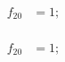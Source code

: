 \cite{foo1999}
\autocite{foo1999}

\begin{align}
  f_{20} &= 1;\\
\end{align}

\begin{eqnarray}
  f_{20} &= 1;\\
\end{eqnarray}


